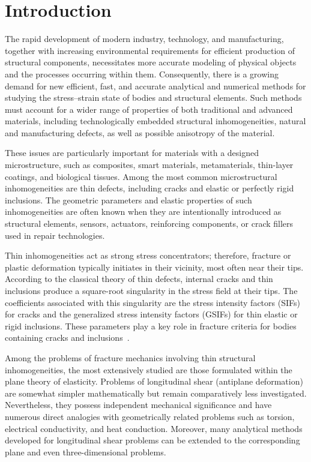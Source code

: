 \section{Introduction}

The rapid development of modern industry, technology, and manufacturing, together with increasing environmental requirements for efficient production of structural components, necessitates more accurate modeling of physical objects and the processes occurring within them. Consequently, there is a growing demand for new efficient, fast, and accurate analytical and numerical methods for studying the stress--strain state of bodies and structural elements. Such methods must account for a wider range of properties of both traditional and advanced materials, including technologically embedded structural inhomogeneities, natural and manufacturing defects, as well as possible anisotropy of the material.

These issues are particularly important for materials with a designed microstructure, such as composites, smart materials, metamaterials, thin-layer coatings, and biological tissues. Among the most common microstructural inhomogeneities are thin defects, including cracks and elastic or perfectly rigid inclusions. The geometric parameters and elastic properties of such inhomogeneities are often known when they are intentionally introduced as structural elements, sensors, actuators, reinforcing components, or crack fillers used in repair technologies.

Thin inhomogeneities act as strong stress concentrators; therefore, fracture or plastic deformation typically initiates in their vicinity, most often near their tips. According to the classical theory of thin defects, internal cracks and thin inclusions produce a square-root singularity in the stress field at their tips. The coefficients associated with this singularity are the stress intensity factors (SIFs) for cracks and the generalized stress intensity factors (GSIFs) for thin elastic or rigid inclusions. These parameters play a key role in fracture criteria for bodies containing cracks and inclusions~\cite{Vasilev6}.

Among the problems of fracture mechanics involving thin structural inhomogeneities, the most extensively studied are those formulated within the plane theory of elasticity. Problems of longitudinal shear (antiplane deformation) are somewhat simpler mathematically but remain comparatively less investigated. Nevertheless, they possess independent mechanical significance and have numerous direct analogies with geometrically related problems such as torsion, electrical conductivity, and heat conduction. Moreover, many analytical methods developed for longitudinal shear problems can be extended to the corresponding plane and even three-dimensional problems.

